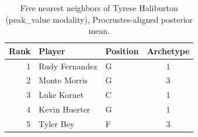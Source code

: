 \begin{table}[htbp]
  \centering\small
  \begin{tabular}{rllc}
    \toprule
    Rank & Player & Position & Archetype \\
    \midrule
    1 & Rudy Fernandez & G & 1 \\
    2 & Monte Morris & G & 3 \\
    3 & Luke Kornet & C & 1 \\
    4 & Kevin Huerter & G & 1 \\
    5 & Tyler Bey & F & 3 \\
    \bottomrule
  \end{tabular}
  \caption{Five nearest neighbors of Tyrese Haliburton (peak_value modality), Procrustes-aligned posterior mean.}
  \label{tab:Tyrese_Haliburton_neighbors_peak_value}
\end{table}

